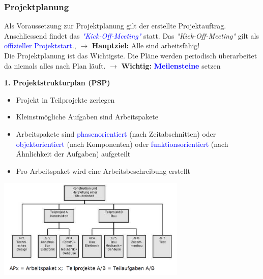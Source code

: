 \vspace{-0.5cm}	
\subsubsection{Projektplanung}
Als Voraussetzung zur Projektplanung gilt der erstellte Projektauftrag. Anschliessend findet das \textcolor{blue}{\textit{"Kick-Off-Meeting"}} statt. \newline Das \textit{"Kick-Off-Meeting"} gilt als \textcolor{blue}{offizieller Projektstart}., $\rightarrow$ \textbf{Hauptziel:} Alle sind arbeitsfähig!\\
Die Projektplanung ist das Wichtigste. Die Pläne werden periodisch überarbeitet da niemals alles nach Plan läuft. \newline 
$\rightarrow$ \textbf{Wichtig:} \textcolor{blue}{\textbf{Meilensteine}} setzen
\vspace{0.2cm}
\\
\begin{minipage}{10cm}
	\textbf{1. Projektstrukturplan (PSP)}
	\begin{itemize}
		\item Projekt in Teilprojekte zerlegen
		\item Kleinstmögliche Aufgaben sind Arbeitspakete
		\item Arbeitspakete sind \textcolor{blue}{phasenorientiert} (nach Zeitabschnitten) oder \textcolor{blue}{objektorientiert} (nach Komponenten) oder \textcolor{blue}{funktionsorientiert} (nach Ähnlichkeit der Aufgaben) aufgeteilt
		\item Pro Arbeitspaket wird eine Arbeitsbeschreibung erstellt
	\end{itemize} 	
\end{minipage}
\begin{minipage}{9cm}
	\includegraphics[width=9cm]{images/PSP.png}
\end{minipage}
\clearpage
\pagebreak

